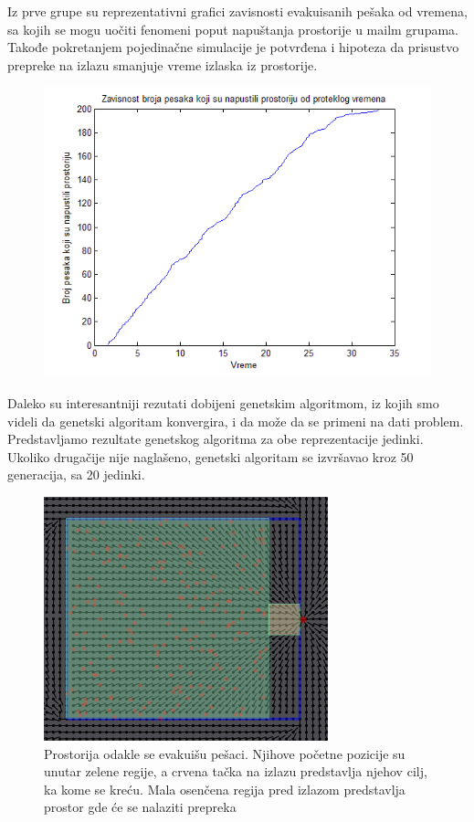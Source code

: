 \documentclass[12pt]{article}
\begin{document}
Iz  prve grupe su reprezentativni grafici zavisnosti evakuisanih pešaka od vremena, sa kojih se mogu uočiti fenomeni poput napuštanja prostorije u mailm grupama. Takođe pokretanjem pojedinačne simulacije je potvrđena i hipoteza da prisustvo prepreke na izlazu smanjuje vreme izlaska iz prostorije.

\begin{figure}
\centering
\includegraphics[scale=.6]{Vreme.png}
\end{figure}

Daleko su interesantniji rezutati dobijeni genetskim algoritmom, iz kojih smo videli da genetski algoritam konvergira, i da može da se primeni na dati problem. Predstavljamo rezultate genetskog algoritma za obe reprezentacije jedinki. Ukoliko drugačije nije naglašeno, genetski algoritam se izvršavao kroz 50 generacija, sa 20 jedinki.

\begin{figure}
\centering
\includegraphics{prostorija}
\caption{Prostorija odakle se evakuišu pešaci. Njihove početne pozicije su unutar zelene regije, a crvena tačka na izlazu predstavlja njehov cilj, ka kome se kreću. Mala osenčena regija pred izlazom predstavlja prostor gde će se nalaziti prepreka}
\label{fig:prostorija1}
\end{figure}
\end{document}
